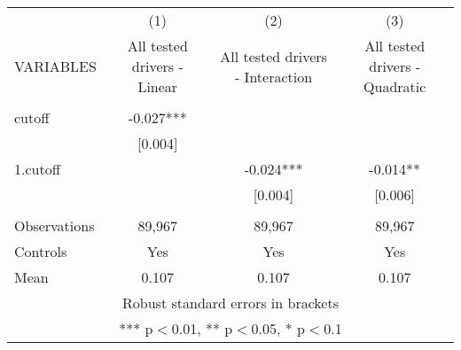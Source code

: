 \documentclass[]{article}
\begin{document}
\begin{tabular}{lccc} \hline
 & (1) & (2) & (3) \\
VARIABLES & All tested drivers - Linear & All tested drivers - Interaction & All tested drivers - Quadratic \\ \hline
 &  &  &  \\
cutoff & -0.027*** &  &  \\
 & [0.004] &  &  \\
1.cutoff &  & -0.024*** & -0.014** \\
 &  & [0.004] & [0.006] \\
 &  &  &  \\
Observations & 89,967 & 89,967 & 89,967 \\
Controls & Yes & Yes & Yes \\
 Mean & 0.107 & 0.107 & 0.107 \\ \hline
\multicolumn{4}{c}{ Robust standard errors in brackets} \\
\multicolumn{4}{c}{ *** p$<$0.01, ** p$<$0.05, * p$<$0.1} \\
\end{tabular}
\end{document}
